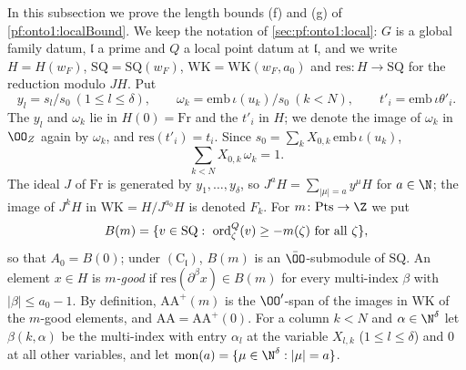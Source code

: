 In this subsection we prove the length bounds (f) and (g) of \cref{pf:onto1:localBound}. We keep the notation of
\cref{sec:pf:onto1:local}: $G$ is a global family datum, $\mathfrak l$ a prime and $Q$ a local point datum at $\mathfrak l$, and
we write $H=H(w_F)$, $\mathrm{SQ}=\mathrm{SQ}(w_F)$, $\mathrm{WK}=\mathrm{WK}(w_F,a_0)$ and $\mathrm{res}\colon H\to\mathrm{SQ}$ for the
reduction modulo $JH$. Put
\[
y_l=s_l/s_0\ (1\le l\le\delta),\qquad \omega_k=\mathrm{emb}\,\iota(u_k)/s_0\ (k<N),\qquad t'_i=\mathrm{emb}\,\iota\theta'_i .
\]
The $y_l$ and $\omega_k$ lie in $H(0)=\mathrm{Fr}$ and the $t'_i$ in $H$; we denote the image of $\omega_k$ in $\OO_Z$ again by
$\omega_k$, and $\mathrm{res}(t'_i)=t_i$. Since $s_0=\sum_kX_{0,k}\,\mathrm{emb}\,\iota(u_k)$,
\begin{equation}\label{pf:onto1:sumone}
\sum_{k<N}X_{0,k}\,\omega_k=1 .
\end{equation}
The ideal $J$ of $\mathrm{Fr}$ is generated by $y_1,\dots,y_\delta$, so $J^aH=\sum_{|\mu|=a}y^\mu H$ for $a\in\N$; the image of
$J^kH$ in $\mathrm{WK}=H/J^{a_0}H$ is denoted $F_k$. For $m\colon\mathrm{Pts}\to\Z$ we put
\[
B(m)=\{v\in\mathrm{SQ}:\ \ontooneord^Q_\zeta(v)\ge-m(\zeta)\ \text{for all }\zeta\},
\]
so that $A_0=B(0)$; under $(\mathrm C_{\mathfrak l})$, $B(m)$ is an $\bar\OO$-submodule of $\mathrm{SQ}$. An element $x\in H$ is
\emph{$m$-good} if $\mathrm{res}(\partial^\beta x)\in B(m)$ for every multi-index $\beta$ with $|\beta|\le a_0-1$. By definition,
$\mathrm{AA}^+(m)$ is the $\OO'$-span of the images in $\mathrm{WK}$ of the $m$-good elements, and $\mathrm{AA}=\mathrm{AA}^+(0)$. For a
column $k<N$ and $\alpha\in\N^\delta$ let $\beta(k,\alpha)$ be the multi-index with entry $\alpha_l$ at the variable $X_{l,k}$
($1\le l\le\delta$) and $0$ at all other variables, and let $\mathrm{mon}(a)=\{\mu\in\N^\delta:|\mu|=a\}$.

